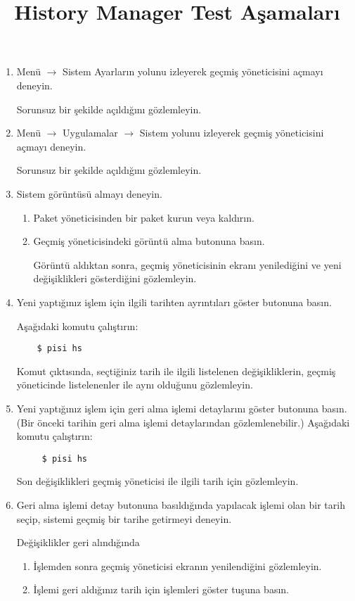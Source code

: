 \documentclass[a4paper,10pt]{article}
\title{History Manager Test Aşamaları}
\begin{document}
\maketitle

\begin{enumerate}
\item Menü $\rightarrow$ Sistem Ayarların yolunu izleyerek geçmiş yöneticisini açmayı deneyin.

Sorunsuz bir şekilde açıldığını gözlemleyin.
\item Menü $\rightarrow$ Uygulamalar $\rightarrow$ Sistem yolunu izleyerek geçmiş yöneticisini açmayı deneyin.

Sorunsuz bir şekilde açıldığını gözlemleyin.
\item Sistem görüntüsü almayı deneyin.
\begin{enumerate}
    \item Paket yöneticisinden bir paket kurun veya kaldırın.
    \item Geçmiş yöneticisindeki görüntü alma butonuna basın.
    
Görüntü aldıktan sonra, geçmiş yöneticisinin ekranı yenilediğini ve yeni değişiklikleri gösterdiğini gözlemleyin.
\end{enumerate}

\item Yeni yaptığınız işlem için ilgili tarihten ayrıntıları göster butonuna basın.

    Aşağıdaki komutu çalıştırın:
\begin{verbatim}
    $ pisi hs
\end{verbatim} 

    Komut çıktısında, seçtiğiniz tarih ile ilgili listelenen değişikliklerin, geçmiş yöneticinde listelenenler ile aynı olduğunu gözlemleyin.

\item Yeni yaptığınız işlem için geri alma işlemi detaylarını göster butonuna basın. (Bir önceki tarihin geri alma işlemi detaylarından gözlemlenebilir.)
    Aşağıdaki komutu çalıştırın:
\begin{verbatim}
     $ pisi hs
\end{verbatim} 
    Son değişiklikleri geçmiş yöneticisi ile ilgili tarih için gözlemleyin.


\item Geri alma işlemi detay butonuna basıldığında yapılacak işlemi olan bir tarih seçip, sistemi geçmiş bir tarihe getirmeyi deneyin. 

      Değişiklikler geri alındığında 
\begin{enumerate}
        \item İşlemden sonra geçmiş yöneticisi ekranın yenilendiğini gözlemleyin.
        \item İşlemi geri aldığınız tarih için işlemleri göster tuşuna basın.


\end{enumerate}
\end{enumerate}
\end{document}

